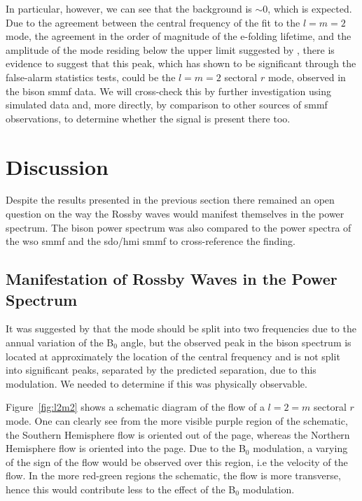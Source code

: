 In particular, however, we can see that the background is $\sim 0$, which is expected. Due to the agreement between the central frequency of the fit to the $l=m=2$ mode, the agreement in the order of magnitude of the e-folding lifetime, and the amplitude of the mode residing below the upper limit suggested by \citet{lanza_sectoral_2019}, there is evidence to suggest that this peak, which has shown to be significant through the false-alarm statistics tests, could be the $l=m=2$ sectoral $r$ mode, observed in the \gls{bison} \gls{smmf} data. We will cross-check this by further investigation using simulated data and, more directly, by comparison to other sources of \gls{smmf} observations, to determine whether the signal is present there too.







\section{Discussion}\label{sec:r-mode_discussion}


Despite the results presented in the previous section there remained an open question on the way the Rossby waves would manifest themselves in the power spectrum. The \gls{bison} power spectrum was also compared to the power spectra of the \gls{wso} \gls{smmf} and the \gls{sdo/hmi} \gls{smmf} to cross-reference the finding.

\subsection{Manifestation of Rossby Waves in the Power Spectrum}

It was suggested by \citet{lanza_sectoral_2019} that the mode should be split into two frequencies due to the annual variation of the B$_0$ angle, but the observed peak in the \gls{bison} spectrum is located at approximately the location of the central frequency and is not split into significant peaks, separated by the predicted separation, due to this modulation. We needed to determine if this was physically observable.

Figure~\ref{fig:l2m2} shows a schematic diagram of the flow of a $l=2=m$ sectoral $r$ mode. One can clearly see from the more visible purple region of the schematic, the Southern Hemisphere flow is oriented out of the page, whereas the Northern Hemisphere flow is oriented into the page. Due to the B$_0$ modulation, a varying of the sign of the flow would be observed over this region, i.e the velocity of the flow. In the more red-green regions the schematic, the flow is more transverse, hence this would contribute less to the effect of the B$_0$ modulation.

